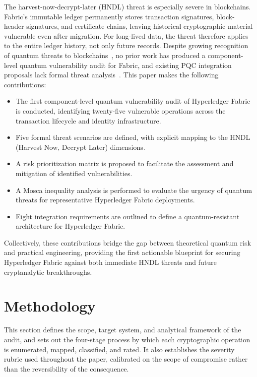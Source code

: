 \documentclass[conference]{IEEEtran}
\begin{document}
The harvest-now-decrypt-later (HNDL) threat is especially severe in
blockchains. Fabric's immutable ledger permanently stores transaction
signatures, block-header signatures, and certificate chains, leaving
historical cryptographic material vulnerable even after migration. For
long-lived data, the threat therefore applies to the entire ledger history,
not only future records.
Despite growing recognition of quantum threats to
blockchains~\cite{fernandez2020, yang2024survey}, no prior work has produced a
component-level quantum vulnerability audit for Fabric, and existing PQC
integration proposals lack formal threat
analysis~\cite{holcomb2021, campbell2019, hu2025prototype, razdan2025postquantum}. This paper makes the following contributions:
\begin{itemize}
    \item The first component-level quantum vulnerability audit of Hyperledger Fabric is conducted, identifying twenty-five vulnerable operations across the transaction lifecycle and identity infrastructure.
    \item Five formal threat scenarios are defined, with explicit mapping to the HNDL (Harvest Now, Decrypt Later) dimensions.
    \item A risk prioritization matrix is proposed to facilitate the assessment and mitigation of identified vulnerabilities.
    \item A Mosca inequality analysis is performed to evaluate the urgency of quantum threats for representative Hyperledger Fabric deployments.
    \item Eight integration requirements are outlined to define a quantum-resistant architecture for Hyperledger Fabric.
\end{itemize}
Collectively, these contributions bridge the gap between theoretical quantum risk and practical engineering, providing the first actionable blueprint for securing Hyperledger Fabric against both immediate HNDL threats and future cryptanalytic breakthroughs.

\section{Methodology}
\label{sec:tm_method}
This section defines the scope, target system, and analytical framework of the audit, and sets out the four-stage process by which each cryptographic operation is enumerated, mapped, classified, and rated. It also establishes the severity rubric used throughout the paper, calibrated on the scope of compromise rather than the reversibility of the consequence.
\end{document}
